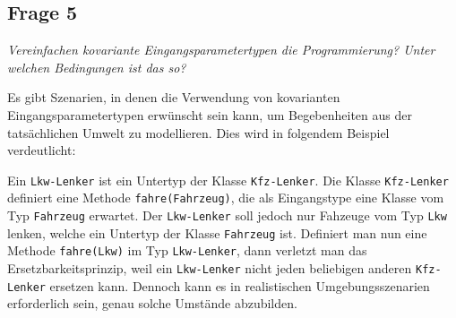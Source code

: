 \documentclass[a4paper,10pt]{article}
\begin{document}
\vspace{3mm}


\subsection{Frage 5}

\emph{Vereinfachen kovariante Eingangsparametertypen die Programmierung? Unter 
welchen Bedingungen ist das so?}

\vspace{3mm}

Es gibt Szenarien, in denen die Verwendung von kovarianten Eingangsparametertypen erwünscht sein kann, um Begebenheiten aus der tatsächlichen Umwelt zu modellieren. Dies wird in folgendem Beispiel verdeutlicht:

Ein \lstinline|Lkw-Lenker| ist ein Untertyp der Klasse \lstinline|Kfz-Lenker|. Die Klasse \lstinline|Kfz-Lenker| definiert eine Methode \lstinline|fahre(Fahrzeug)|, die als Eingangstype eine Klasse vom Typ \lstinline|Fahrzeug| erwartet. Der \lstinline|Lkw-Lenker| soll jedoch nur Fahzeuge vom Typ \lstinline|Lkw| lenken, welche ein Untertyp der Klasse \lstinline|Fahrzeug| ist. Definiert man nun eine Methode \lstinline|fahre(Lkw)| im Typ \lstinline|Lkw-Lenker|, dann verletzt man das Ersetzbarkeitsprinzip, weil ein \lstinline|Lkw-Lenker| nicht jeden beliebigen anderen \lstinline|Kfz-Lenker| ersetzen kann. Dennoch kann es in realistischen Umgebungsszenarien erforderlich sein, genau solche Umstände abzubilden.





\begin{comment}
Von OOP: Mehrfach dynamisches Binden, Multimethoden.
\end{comment}
\end{document}
